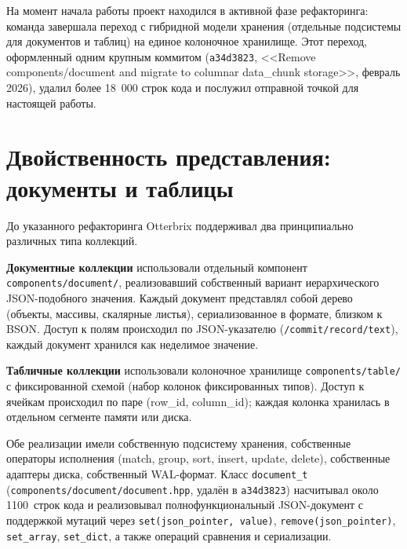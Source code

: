 На момент начала работы проект находился в активной фазе
рефакторинга: команда завершала переход с гибридной модели
хранения (отдельные подсистемы для документов и таблиц) на единое
колоночное хранилище. Этот переход, оформленный одним крупным
коммитом (\texttt{a34d3823}, <<Remove components/document and
migrate to columnar data\_chunk storage>>, февраль 2026), удалил
более 18~000 строк кода и послужил отправной точкой для настоящей
работы.

\section{Двойственность представления: документы и таблицы}

До указанного рефакторинга Otterbrix поддерживал два
принципиально различных типа коллекций.

\textbf{Документные коллекции} использовали отдельный компонент
\texttt{components/document/}, реализовавший собственный вариант
иерархического JSON-подобного значения. Каждый документ
представлял собой дерево (объекты, массивы, скалярные листья),
сериализованное в формате, близком к BSON. Доступ к полям
происходил по JSON-указателю (\texttt{/commit/record/text}),
каждый документ хранился как неделимое значение.

\textbf{Табличные коллекции} использовали колоночное хранилище
\texttt{components/table/} с фиксированной схемой (набор колонок
фиксированных типов). Доступ к ячейкам происходил по паре
(row\_id, column\_id); каждая колонка хранилась в отдельном
сегменте памяти или диска.

Обе реализации имели собственную подсистему хранения, собственные
операторы исполнения (match, group, sort, insert, update, delete),
собственные адаптеры диска, собственный WAL-формат. Класс
\texttt{document\_t} (\texttt{components/document/document.hpp},
удалён в \texttt{a34d3823}) насчитывал около 1100~строк кода и
реализовывал полнофункциональный JSON-документ с поддержкой
мутаций через \texttt{set(json\_pointer, value)},
\texttt{remove(json\_pointer)}, \texttt{set\_array},
\texttt{set\_dict}, а также операций сравнения и сериализации.

